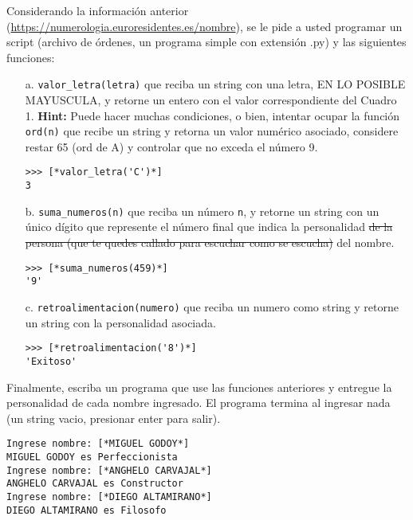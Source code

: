 Considerando la información anterior (\url{https://numerologia.euroresidentes.es/nombre}), se le pide a usted programar un script (archivo de órdenes, un programa simple con extensión .py) y las siguientes funciones:
\begin{enumerate}
    \item[a.] \texttt{valor\_letra(letra)} que reciba un string con una letra, EN LO POSIBLE MAYUSCULA, y retorne un entero con el valor correspondiente del Cuadro 1. \textbf{Hint:} Puede hacer muchas condiciones, o bien, intentar ocupar la función \texttt{ord(n)} que recibe un string y retorna un valor numérico asociado, considere restar 65 (ord de A) y controlar que no exceda el número 9.
\begin{lstlisting}[style=consola]
>>> [*valor_letra('C')*]
3
\end{lstlisting}
    \item[b.] \texttt{suma\_numeros(n)} que reciba un número \texttt{n}, y retorne un string con un único dígito que represente el número final que indica la personalidad \sout{de la persona (que te quedes callado para escuchar como se escucha)} del nombre.
    \begin{lstlisting}[style=consola]
>>> [*suma_numeros(459)*]
'9'
    \end{lstlisting}
    \item[c.] \texttt{retroalimentacion(numero)} que reciba un numero como string y retorne un string con la personalidad asociada.
\begin{lstlisting}[style=consola]
>>> [*retroalimentacion('8')*]
'Exitoso'
\end{lstlisting}
\end{enumerate}

Finalmente, escriba un programa que use las funciones anteriores y entregue la personalidad de cada nombre ingresado. El programa termina al ingresar nada (un string vacio, presionar enter para salir).

\begin{lstlisting}[style=consola]
Ingrese nombre: [*MIGUEL GODOY*]
MIGUEL GODOY es Perfeccionista
Ingrese nombre: [*ANGHELO CARVAJAL*]
ANGHELO CARVAJAL es Constructor
Ingrese nombre: [*DIEGO ALTAMIRANO*]
DIEGO ALTAMIRANO es Filosofo
\end{lstlisting}